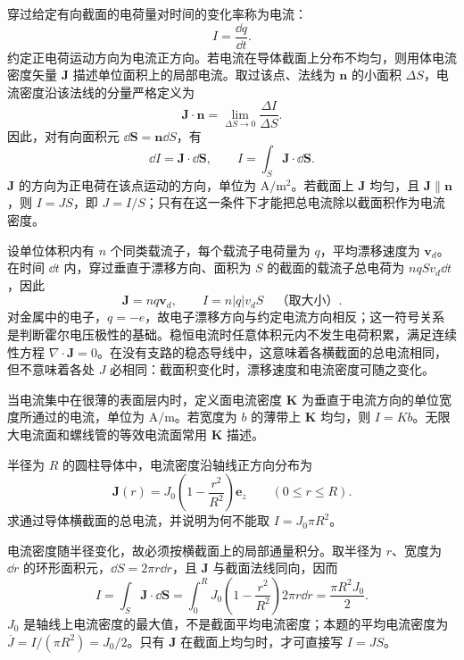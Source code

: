 \begin{definition}[电流与体电流密度]\label{def:current-density}
穿过给定有向截面的电荷量对时间的变化率称为电流：
\[
  I=\frac{\dd q}{\dd t}.
\]
约定正电荷运动方向为电流正方向。若电流在导体截面上分布不均匀，则用体电流密度矢量 $\bm J$ 描述单位面积上的局部电流。取过该点、法线为 $\bm n$ 的小面积 $\Delta S$，电流密度沿该法线的分量严格定义为
\[
  \bm J\cdot\bm n
  =\lim_{\Delta S\to0}\frac{\Delta I}{\Delta S}.
\]
因此，对有向面积元 $\dd\bm S=\bm n\dd S$，有
\[
  \dd I=\bm J\cdot\dd\bm S,
  \qquad
  I=\int_S\bm J\cdot\dd\bm S.
\]
$\bm J$ 的方向为正电荷在该点运动的方向，单位为 $\mathrm{A/m^2}$。若截面上 $\bm J$ 均匀，且 $\bm J\parallel\bm n$，则 $I=JS$，即 $J=I/S$；只有在这一条件下才能把总电流除以截面积作为电流密度。
\end{definition}

设单位体积内有 $n$ 个同类载流子，每个载流子电荷量为 $q$，平均漂移速度为 $\bm v_d$。在时间 $\dd t$ 内，穿过垂直于漂移方向、面积为 $S$ 的截面的载流子总电荷为 $nqSv_d\dd t$，因此
\[
  \bm J=nq\bm v_d,
  \qquad
  I=n|q|v_dS\quad\text{（取大小）}.
\]
对金属中的电子，$q=-e$，故电子漂移方向与约定电流方向相反；这一符号关系是判断霍尔电压极性的基础。稳恒电流时任意体积元内不发生电荷积累，满足连续性方程 $\nabla\cdot\bm J=0$。在没有支路的稳态导线中，这意味着各横截面的总电流相同，但不意味着各处 $J$ 必相同：截面积变化时，漂移速度和电流密度可随之变化。

\begin{definition}[面电流密度]\label{def:surface-current-density}
当电流集中在很薄的表面层内时，定义面电流密度 $\bm K$ 为垂直于电流方向的单位宽度所通过的电流，单位为 $\mathrm{A/m}$。若宽度为 $b$ 的薄带上 $\bm K$ 均匀，则 $I=Kb$。无限大电流面和螺线管的等效电流面常用 $\bm K$ 描述。
\end{definition}

\begin{example}[title={由非均匀电流密度求总电流}]\label{eg:current-density-integral}
半径为 $R$ 的圆柱导体中，电流密度沿轴线正方向分布为
\[
  \bm J(r)=J_0\left(1-\frac{r^2}{R^2}\right)\bm e_z
  \qquad(0\le r\le R).
\]
求通过导体横截面的总电流，并说明为何不能取 $I=J_0\pi R^2$。
\begin{solution}
电流密度随半径变化，故必须按横截面上的局部通量积分。取半径为 $r$、宽度为 $\dd r$ 的环形面积元，$\dd S=2\pi r\dd r$，且 $\bm J$ 与截面法线同向，因而
\[
  I=\int_S\bm J\cdot\dd\bm S
  =\int_0^R J_0\left(1-\frac{r^2}{R^2}\right)2\pi r\dd r
  =\frac{\pi R^2J_0}{2}.
\]
$J_0$ 是轴线上电流密度的最大值，不是截面平均电流密度；本题的平均电流密度为 $\overline J=I/(\pi R^2)=J_0/2$。只有 $\bm J$ 在截面上均匀时，才可直接写 $I=JS$。
\end{solution}
\end{example}

